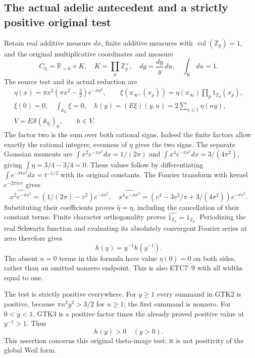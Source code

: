 \subsection{The actual adelic antecedent and a strictly positive original test}

Retain real additive measure $dx$, finite additive measures with
$\operatorname{vol}(\mathbb Z_p)=1$, and the original multiplicative
coordinates and measure
\begin{equation}\tag{GTK1}
 C_{\mathbb Q}=\mathbb R_{>0}\times K,\quad
 K=\prod_p\mathbb Z_p^\times,\quad
 dg=\frac{dy}{y}\,du,\quad \int_Kdu=1.
\end{equation}
The source test and its actual reduction are
\begin{equation}\tag{GTK2}
 \begin{gathered}
 \eta(x)=\pi x^2(\pi x^2-\tfrac32)e^{-\pi x^2},\qquad
 \xi(x_\infty,(x_p))=\eta(x_\infty)\prod_p1_{\mathbb Z_p}(x_p),\\
 \xi(0)=0,\quad \int_{\mathbb A_{\mathbb Q}}\xi=0,\quad
 h(y)=(E\xi)(y,u)=2\sum_{n\ge1}\eta(ny),\\
 V=E\mathcal S(\mathbb A_{\mathbb Q})_0,\qquad h\in V.
 \end{gathered}
\end{equation}
The factor two is the sum over both rational signs. Indeed the
finite factors allow exactly the rational integers; evenness of
$\eta$ gives the two signs. The separate Gaussian moments are
$\int x^2e^{-\pi x^2}dx=1/(2\pi)$ and
$\int x^4e^{-\pi x^2}dx=3/(4\pi^2)$, giving
$\int\eta=3/4-3/4=0$. These values follow by differentiating
$\int e^{-\pi t x^2}dx=t^{-1/2}$ with its original constants.
The Fourier transform with kernel $e^{-2\pi ixv}$ gives
\[
 \widehat{x^2e^{-\pi x^2}}=(1/(2\pi)-v^2)e^{-\pi v^2},\quad
 \widehat{x^4e^{-\pi x^2}}=
 (v^4-3v^2/\pi+3/(4\pi^2))e^{-\pi v^2}.
\]
Substituting their coefficients proves $\widehat\eta=\eta$,
including the cancellation of their constant terms. Finite
character orthogonality proves
$\widehat{1_{\mathbb Z_p}}=1_{\mathbb Z_p}$.
Periodizing the real Schwartz function and evaluating its
absolutely convergent Fourier series at zero therefore gives
\begin{equation}\tag{GTK3}
 h(y)=y^{-1}h(y^{-1}).
\end{equation}
The absent $n=0$ terms in this formula have value $\eta(0)=0$
on both sides, rather than an omitted nonzero endpoint.
This is also ETC7--9 with all widths equal to one.

The test is strictly positive everywhere. For $y\ge1$ every
summand in GTK2 is positive, because
$\pi n^2y^2>3/2$ for $n\ge1$; the first summand is nonzero.
For $0<y<1$, GTK3 is a positive factor times the already
proved positive value at $y^{-1}>1$. Thus
\begin{equation}\tag{GTK4}
 h(y)>0\quad(y>0).
\end{equation}
This assertion concerns this original theta-image test; it is
not positivity of the global Weil form.

